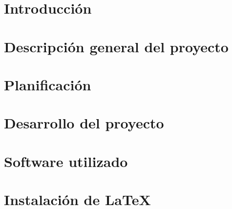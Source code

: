 \documentclass[a4paper,11pt]{book}
\begin{document}
\renewcommand{\figurename}{Figura}
\renewcommand{\listfigurename}{Indice de figuras}
\renewcommand{\tablename}{Tabla}
\renewcommand{\listtablename}{Indice de tablas}

\pagestyle{empty}

\cleardoublepage


\cleardoublepage
\pagestyle{plain}

\frontmatter %



\tableofcontents
\listoffigures
\listoftables

\mainmatter %

\chapter{Introducción}


\chapter{Descripción general del proyecto}


\chapter{Planificación}


\chapter{Desarrollo del proyecto}


\backmatter %


\clearpage
{}




\chapter*{Software utilizado}


\chapter*{Instalación de \LaTeX}



\end{document}
